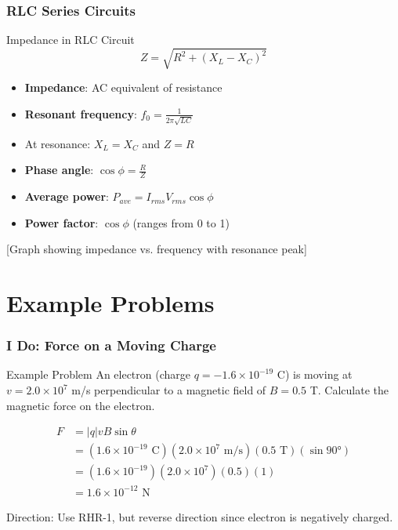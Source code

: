 \documentclass{beamer}
\begin{document}
\begin{frame}
\frametitle{RLC Series Circuits}
\begin{block}{Impedance in RLC Circuit}
\begin{equation}
Z = \sqrt{R^2 + (X_L - X_C)^2}
\end{equation}
\end{block}
\begin{itemize}
    \item \textbf{Impedance}: AC equivalent of resistance
    \item \textbf{Resonant frequency}: $f_0 = \frac{1}{2\pi\sqrt{LC}}$
    \item At resonance: $X_L = X_C$ and $Z = R$
    \item \textbf{Phase angle}: $\cos\phi = \frac{R}{Z}$
    \item \textbf{Average power}: $P_{ave} = I_{rms}V_{rms}\cos\phi$
    \item \textbf{Power factor}: $\cos\phi$ (ranges from 0 to 1)
\end{itemize}
\alert{[Graph showing impedance vs. frequency with resonance peak]}
\end{frame}

\section{Example Problems}

\begin{frame}
\frametitle{I Do: Force on a Moving Charge}
\begin{block}{Example Problem}
An electron (charge $q = -1.6 \times 10^{-19}$ C) is moving at $v = 2.0 \times 10^7$ m/s perpendicular to a magnetic field of $B = 0.5$ T. Calculate the magnetic force on the electron.
\end{block}

\begin{align}
F &= |q|vB\sin\theta \\
&= (1.6 \times 10^{-19} \text{ C})(2.0 \times 10^7 \text{ m/s})(0.5 \text{ T})(\sin 90°) \\
&= (1.6 \times 10^{-19})(2.0 \times 10^7)(0.5)(1) \\
&= 1.6 \times 10^{-12} \text{ N}
\end{align}

Direction: Use RHR-1, but reverse direction since electron is negatively charged.
\end{frame}
\end{document}
